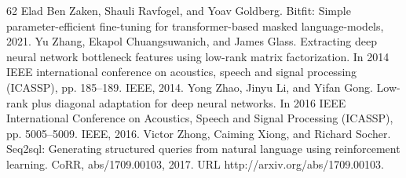 \documentclass[conference]{IEEEtran}
\begin{document}
\begin{thebibliography}{62}
 Elad Ben Zaken, Shauli Ravfogel, and Yoav Goldberg. Bitfit: Simple parameter-efficient fine-tuning for transformer-based masked language-models, 2021.
 Yu Zhang, Ekapol Chuangsuwanich, and James Glass. Extracting deep neural network bottleneck features using low-rank matrix factorization. In 2014 IEEE international conference on acoustics, speech and signal processing (ICASSP), pp. 185–189. IEEE, 2014.
 Yong Zhao, Jinyu Li, and Yifan Gong. Low-rank plus diagonal adaptation for deep neural networks. In 2016 IEEE International Conference on Acoustics, Speech and Signal Processing (ICASSP), pp. 5005–5009. IEEE, 2016.
 Victor Zhong, Caiming Xiong, and Richard Socher. Seq2sql: Generating structured queries from natural language using reinforcement learning. CoRR, abs/1709.00103, 2017. URL http://arxiv.org/abs/1709.00103.
\end{thebibliography}
\end{document}
